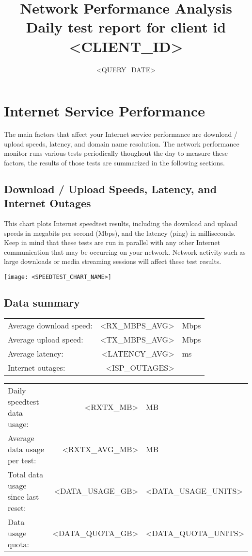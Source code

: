 \documentclass[11pt]{article}
\title{\vspace{-0.5in}\huge{Network Performance Analysis\\\large Daily test report for client id <CLIENT_ID>}\vspace{-0.5in}
}
\begin{document}
\setlength{\parindent}{0pt}
\date{<QUERY_DATE>}
\maketitle
\section{Internet Service Performance}
The main factors that affect your Internet service performance are download / upload speeds, latency, and domain name resolution. The network performance monitor runs various tests periodically thoughout the day to measure these factors, the results of those tests are summarized in the following sections.
\subsection{Download / Upload Speeds, Latency, and Internet Outages}
This chart plots Internet speedtest results, including the download and upload speeds in megabits per second (Mbps), and the latency (ping) in milliseconds. Keep in mind that these tests are run in parallel with any other Internet communication that may be occurring on your network. Network activity such as large downloads or media streaming sessions will affect these test results. 
\begin{center}
\texttt{[image: <SPEEDTEST\_CHART\_NAME>]}
\end{center}
\subsection{Data summary}
\begin{minipage}[t]{0.5\textwidth}
\begin{tabular}{@{}l@{\hskip 0.1in}r@{\hskip 0.025in}l@{}}
Average download speed: & <RX_MBPS_AVG> & Mbps \\
Average upload speed: & <TX_MBPS_AVG> & Mbps \\
Average latency: & <LATENCY_AVG> & ms \\
Internet outages: & <ISP_OUTAGES> & \\
\end{tabular}
\end{minipage}
\begin{minipage}[t]{0.5\textwidth}
\begin{flushright}
\begin{tabular}{@{}l@{\hskip 0.1in}r@{\hskip 0.025in}l@{}}
Daily speedtest data usage: & <RXTX_MB> & MB \\
Average data usage per test: & <RXTX_AVG_MB> & MB \\
Total data usage since last reset: & <DATA_USAGE_GB> & <DATA_USAGE_UNITS> \\
Data usage quota: & <DATA_QUOTA_GB> & <DATA_QUOTA_UNITS>\\
\end{tabular}
\end{flushright}
\end{minipage}
\end{document}
